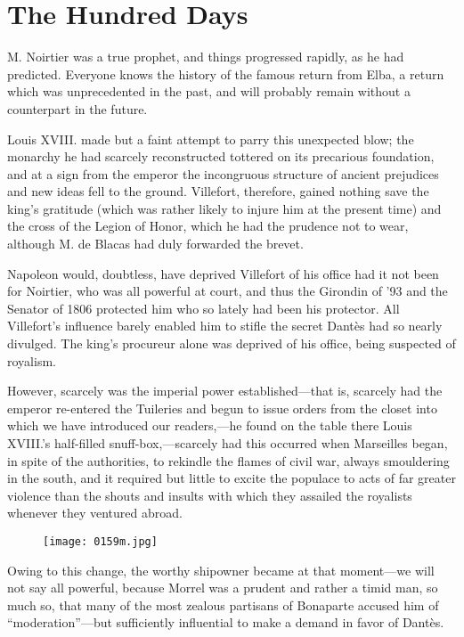 \chapter{The Hundred Days}

M. Noirtier was a true prophet, and things progressed rapidly, as he
had predicted. Everyone knows the history of the famous return from
Elba, a return which was unprecedented in the past, and will probably
remain without a counterpart in the future.

Louis XVIII. made but a faint attempt to parry this unexpected blow;
the monarchy he had scarcely reconstructed tottered on its precarious
foundation, and at a sign from the emperor the incongruous structure of
ancient prejudices and new ideas fell to the ground. Villefort,
therefore, gained nothing save the king’s gratitude (which was rather
likely to injure him at the present time) and the cross of the Legion
of Honor, which he had the prudence not to wear, although M. de Blacas
had duly forwarded the brevet.

Napoleon would, doubtless, have deprived Villefort of his office had it
not been for Noirtier, who was all powerful at court, and thus the
Girondin of ’93 and the Senator of 1806 protected him who so lately had
been his protector. All Villefort’s influence barely enabled him to
stifle the secret Dantès had so nearly divulged. The king’s procureur
alone was deprived of his office, being suspected of royalism.

However, scarcely was the imperial power established—that is, scarcely
had the emperor re-entered the Tuileries and begun to issue orders from
the closet into which we have introduced our readers,—he found on the
table there Louis XVIII.’s half-filled snuff-box,—scarcely had this
occurred when Marseilles began, in spite of the authorities, to
rekindle the flames of civil war, always smouldering in the south, and
it required but little to excite the populace to acts of far greater
violence than the shouts and insults with which they assailed the
royalists whenever they ventured abroad.

\begin{figure}[ht]
\texttt{[image: 0159m.jpg]}
\end{figure}

Owing to this change, the worthy shipowner became at that moment—we
will not say all powerful, because Morrel was a prudent and rather a
timid man, so much so, that many of the most zealous partisans of
Bonaparte accused him of “moderation”—but sufficiently influential to
make a demand in favor of Dantès.

